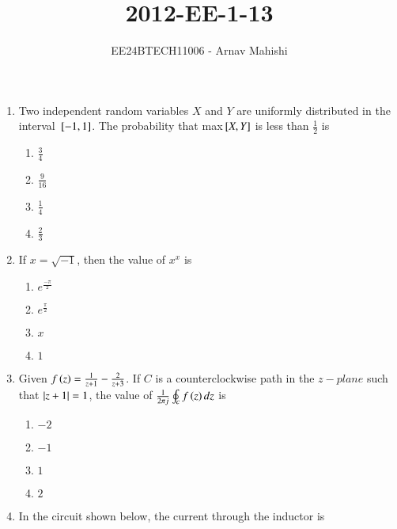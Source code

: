 \documentclass[journal]{IEEEtran}
\begin{document}

\vspace{3cm}

\title{2012-EE-1-13}
\author{EE24BTECH11006 - Arnav Mahishi}
{\let\newpage\relax\maketitle}
\begin{enumerate}
\item{
Two independent random variables $X$ and $Y$ are uniformly distributed in the interval ${}\left[-1,1\right]$. The probability that max${}\left[X,Y\right]$ is less than $\frac{1}{2}$ is 
\begin{multicols}{4}
\begin{enumerate}
\item $\frac{3}{4}$
\item $\frac{9}{16}$
\item $\frac{1}{4}$
\item $\frac{2}{3}$
\end{enumerate}
\end{multicols}
}
\item{
If $x=\sqrt{-1}$, then the value of $x^x$ is
\begin{multicols}{4}
\begin{enumerate}
\item $e^{\frac{-\pi}{2}}$ 
\item $e^{\frac{\pi}{2}}$ 
\item $x$
\item $1$ 
\end{enumerate}
\end{multicols}}
\item{
Given $f\left(z\right)=\frac{1}{z+1}-\frac{2}{z+3}$. If $C$ is a counterclockwise path in the $z-plane$ such that $\left\vert z+1\right\vert=1$, the value of $\frac{1}{2\pi j}\oint_cf\left(z\right)dz$ is
\begin{multicols}{4}
\begin{enumerate}
\item $-2$
\item $-1$
\item $1$
\item $2$
\end{enumerate}
\end{multicols}
}
\item{
In the circuit shown below, the current through the inductor is
}
\end{enumerate}
\end{document}
